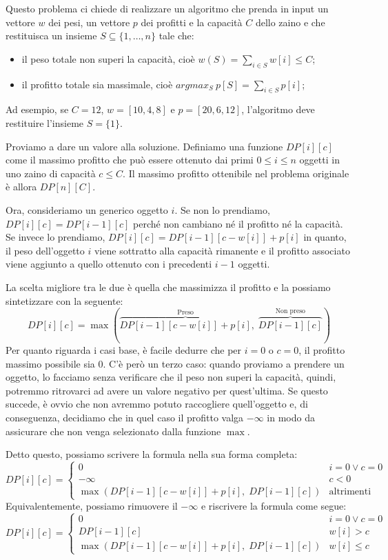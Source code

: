 \noindent
Questo problema ci chiede di realizzare un algoritmo che prenda in input un
vettore $w$ dei pesi, un vettore $p$ dei profitti e la capacità $C$ dello zaino
e che restituisca un insieme $S\subseteq\{1,\dots,n\}$ tale che:
\begin{itemize}
    \item il peso totale non superi la capacità, cioè $w(S)=\sum_{i\in S}w[i]
    \leq C$;
    \item il profitto totale sia massimale, cioè $argmax_S\ p[S]=\sum_{i\in S}
    p[i]$;
\end{itemize}
Ad esempio, se $C=12$, $w=[10,4,8]$ e $p=[20,6,12]$, l'algoritmo deve
restituire l'insieme $S=\{1\}$.

\bigskip\noindent
Proviamo a dare un valore alla soluzione. Definiamo una funzione $DP[i][c]$ come
il massimo profitto che può essere ottenuto dai primi $0\leq i\leq n$ oggetti
in uno zaino di capacità $c\leq C$. Il massimo profitto ottenibile nel problema
originale è allora $DP[n][C]$.

Ora, consideriamo un generico oggetto $i$. Se non lo prendiamo, $DP[i][c]=
DP[i-1][c]$ perché non cambiano né il profitto né la capacità. Se invece lo
prendiamo, $DP[i][c]=DP[i-1][c-w[i]]+p[i]$ in quanto, il peso dell'oggetto $i$
viene sottratto alla capacità rimanente e il profitto associato viene aggiunto
a quello ottenuto con i precedenti $i-1$ oggetti.

La scelta migliore tra le due è quella che massimizza il profitto e la possiamo
sintetizzare con la seguente:
\[DP[i][c]=\max\left(\overbrace{DP[i-1][c-w[i]]+p[i]}^{\text{Preso}},\;
\overbrace{DP[i-1][c]}^{\text{Non preso}}\right)\]
Per quanto riguarda i casi base, è facile dedurre che per $i=0$ o $c=0$, il
profitto massimo possibile sia $0$. C'è però un terzo caso: quando proviamo a
prendere un oggetto, lo facciamo senza verificare che il peso non superi la
capacità, quindi, potremmo ritrovarci ad avere un valore negativo per quest'ultima.
Se questo succede, è ovvio che non avremmo potuto raccogliere quell'oggetto e,
di conseguenza, decidiamo che in quel caso il profitto valga $-\infty$ in modo da
assicurare che non venga selezionato dalla funzione $\max$.

Detto questo, possiamo scrivere la formula nella sua forma completa:
\[DP[i][c]=\begin{cases}
    0 & i=0 \vee c=0\\
    -\infty & c<0\\
    \max\left(DP[i-1][c-w[i]]+p[i],\; DP[i-1][c]\right) & \text{altrimenti}
\end{cases}\]
Equivalentemente, possiamo rimuovere il $-\infty$ e riscrivere la formula come
segue:
\[DP[i][c]=\begin{cases}
    0 & i=0 \vee c=0\\
    DP[i-1][c] & w[i]>c\\
    \max\left(DP[i-1][c-w[i]]+p[i],\; DP[i-1][c]\right) & w[i]\leq c
\end{cases}\]

